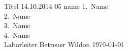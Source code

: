 \TUHeader                          %
{Titel}                       %
{14.10.2014}                        %
{05}                            %
{name}                   %
{
1.~Name\\
2.~Name\\                    %
3.~Name \\ 
4.~Name \\                 %
}
{Laborleiter}
{Betreuer}                          %
{Wildon}                              %
{\today}                            %




\pagebreak
  
\tableofcontents
  
\pagebreak